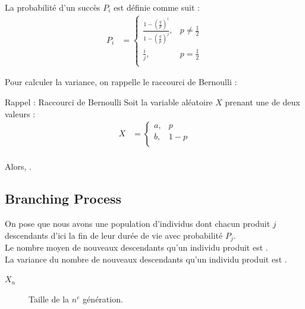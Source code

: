 \documentclass[10pt, french]{article}
\begin{document}
\begin{multicols*}{2}
\begin{definitionNOHFILLprop}
\

La probabilité d'un succès $P_{i}$ est définie comme suit : 
\begin{align*}
	P_{i}
	&=	\begin{cases}
		\frac{1 - \left(\frac{q}{p}\right)^{i}}{1 - \left(\frac{q}{p}\right)^{j}},	&	p \neq \frac{1}{2}	\\
		\frac{i}{j},	&	p = \frac{1}{2}	\\
	\end{cases}
\end{align*}
\end{definitionNOHFILLprop}

Pour calculer la variance, on rappelle le raccourci de Bernoulli :
\begin{rappel}{Rappel : Raccourci de Bernoulli}
Soit la variable aléatoire $X$ prenant une de deux valeurs : \\
\begin{align*}
	X
	&=	\begin{cases}
		a,	&	p	\\
		b,	&	1 - p	\\
	\end{cases}	\\
\end{align*}

Alors, .
\end{rappel}


\columnbreak
\subsection{Branching Process}
\begin{rappel_enhanced}[Contexte]
On pose que nous avons une population d'individus dont chacun produit $j$ descendants d'ici la fin de leur durée de vie avec probabilité $P_{j}$.\\

Le nombre moyen de nouveaux descendants qu'un individu produit est .\\

La variance du nombre de nouveaux descendants qu'un individu produit est .
\end{rappel_enhanced}

\begin{distributions}[Notation]
\begin{description}
	\item[$X_{n}$]	Taille de la $n^{e}$ génération.
\end{description}
\end{distributions}


\end{multicols*}
\end{document}
